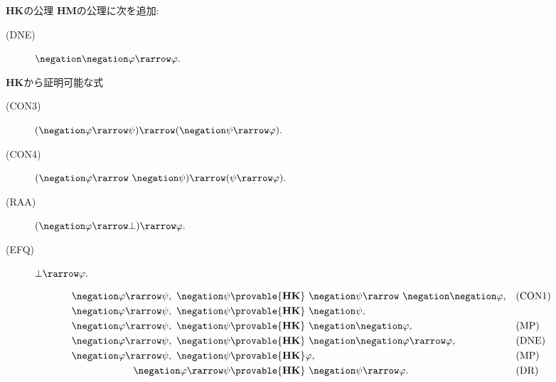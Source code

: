 	\begin{itembox}[l]{{\bf HK}の公理}
		{\bf HM}の公理に次を追加:
		\begin{description}
			\item[(DNE)] $\negation \negation \varphi \rarrow \varphi.$
		\end{description}
	\end{itembox}
	
	{\bf HK}から証明可能な式
	\begin{description}
		\item[(CON3)] $(\negation \varphi \rarrow \psi) \rarrow (\negation \psi \rarrow \varphi).$
		\item[(CON4)] $(\negation \varphi \rarrow\ \negation \psi) 
			\rarrow (\psi \rarrow \varphi).$
		\item[(RAA)] $(\negation \varphi \rarrow \bot) \rarrow \varphi.$
		\item[(EFQ)] $\bot \rarrow \varphi.$
	\end{description}
	
	\begin{sketch}[CON3]
		\begin{align}
			\negation \varphi \rarrow \psi,\ \negation \psi &\provable{\mbox{{\bf HK}}}
				\ \negation \psi \rarrow\ \negation \negation \varphi,
				&& \mbox{(CON1)} \\
			\negation \varphi \rarrow \psi,\ \negation \psi &\provable{\mbox{{\bf HK}}}
				\ \negation \psi, \\
			\negation \varphi \rarrow \psi,\ \negation \psi &\provable{\mbox{{\bf HK}}}
				\ \negation \negation \varphi, && \mbox{(MP)} \\
			\negation \varphi \rarrow \psi,\ \negation \psi &\provable{\mbox{{\bf HK}}}
				\ \negation \negation \varphi \rarrow \varphi, && \mbox{(DNE)} \\
			\negation \varphi \rarrow \psi,\ \negation \psi &\provable{\mbox{{\bf HK}}}
				\varphi, && \mbox{(MP)} \\
			\negation \varphi \rarrow \psi &\provable{\mbox{{\bf HK}}}
				\ \negation \psi \rarrow \varphi. && \mbox{(DR)}
		\end{align}
		\QED
	\end{sketch}
	
